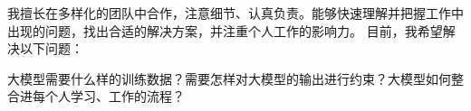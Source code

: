 

\begin{cvparagraph}

我擅长在多样化的团队中合作，注意细节、认真负责。能够快速理解并把握工作中出现的问题，找出合适的解决方案，并注重个人工作的影响力。
目前，我希望解决以下问题：

大模型需要什么样的训练数据？需要怎样对大模型的输出进行约束？大模型如何整合进每个人学习、工作的流程？


\end{cvparagraph}
